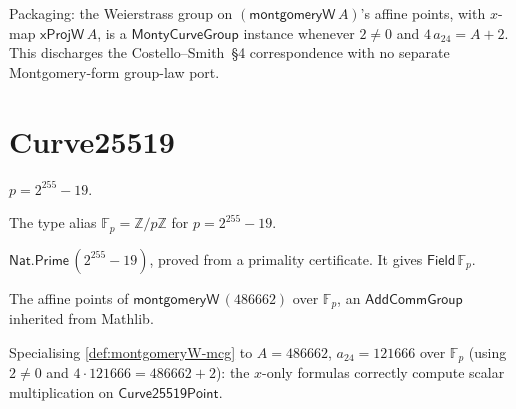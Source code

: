 \begin{definition}
  \label{def:montgomeryW-mcg}
  \leanok
  Packaging: the Weierstrass group on $(\mathsf{montgomeryW}\,A)$'s affine
  points, with $x$-map $\mathsf{xProjW}\,A$, is a
  $\mathsf{MontyCurveGroup}$ instance whenever $2 \neq 0$ and
  $4\,a_{24} = A + 2$. This discharges the Costello--Smith~\S4
  correspondence with no separate Montgomery-form group-law port.
\end{definition}

\section{Curve25519}

\begin{definition}
  \label{def:curve25519-prime}
  \leanok
  $p = 2^{255} - 19$.
\end{definition}

\begin{definition}
  \label{def:fp25519}
  \leanok
  The type alias $\mathbb{F}_p = \mathbb{Z}/p\mathbb{Z}$ for
  $p = 2^{255} - 19$.
\end{definition}

\begin{theorem}
  \label{def:curve25519-prime-prime}
  \leanok
  $\mathsf{Nat.Prime}\,(2^{255} - 19)$, proved from a primality certificate.
  It gives $\mathsf{Field}\,\mathbb{F}_p$.
\end{theorem}

\begin{definition}
  \label{def:curve25519-point}
  \leanok
  The affine points of $\mathsf{montgomeryW}\,(486662)$ over
  $\mathbb{F}_p$, an $\mathsf{AddCommGroup}$ inherited from Mathlib.
\end{definition}

\begin{definition}
  \label{def:curve25519-mcg}
  \leanok
  Specialising \ref{def:montgomeryW-mcg} to $A = 486662$,
  $a_{24} = 121666$ over $\mathbb{F}_p$ (using $2 \neq 0$ and
  $4\cdot 121666 = 486662 + 2$): the $x$-only formulas correctly compute
  scalar multiplication on $\mathsf{Curve25519Point}$.
\end{definition}

